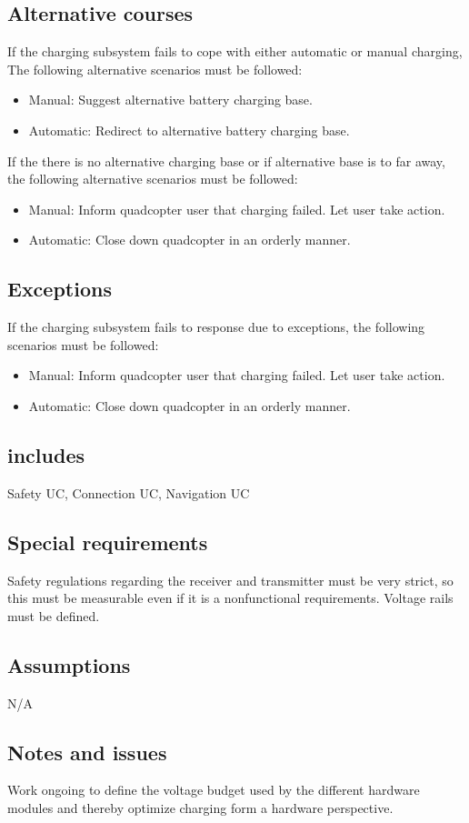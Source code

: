 \documentclass[a4paper]{article}
\begin{document}
\subsection{Alternative courses}
If the charging subsystem fails to cope with either automatic or manual charging,
The following alternative scenarios must be followed:
\begin{itemize}
	\item Manual: Suggest alternative battery charging base.
	\item Automatic: Redirect to alternative battery charging base.
\end{itemize}
If the there is no alternative charging base or if alternative base is to far away,
the following alternative scenarios must be followed:
\begin{itemize}
	\item Manual: Inform quadcopter user that charging failed. Let user take action.
	\item Automatic: Close down quadcopter in an orderly manner.
\end{itemize}
\subsection{Exceptions}
If the charging subsystem fails to response due to exceptions, the following scenarios must be followed:
\begin{itemize}
	\item Manual: Inform quadcopter user that charging failed. Let user take action.
	\item Automatic: Close down quadcopter in an orderly manner.
\end{itemize}
\subsection{includes}
Safety UC, Connection UC, Navigation UC
\subsection{Special requirements}
Safety regulations regarding the receiver and transmitter must be very strict, so this must be measurable even if it is  a nonfunctional requirements. Voltage rails must be defined.
\subsection{Assumptions}
N/A
\subsection{Notes and issues}
Work ongoing to define the voltage budget used by the different hardware modules and thereby optimize charging form a hardware perspective.
\end{document}
